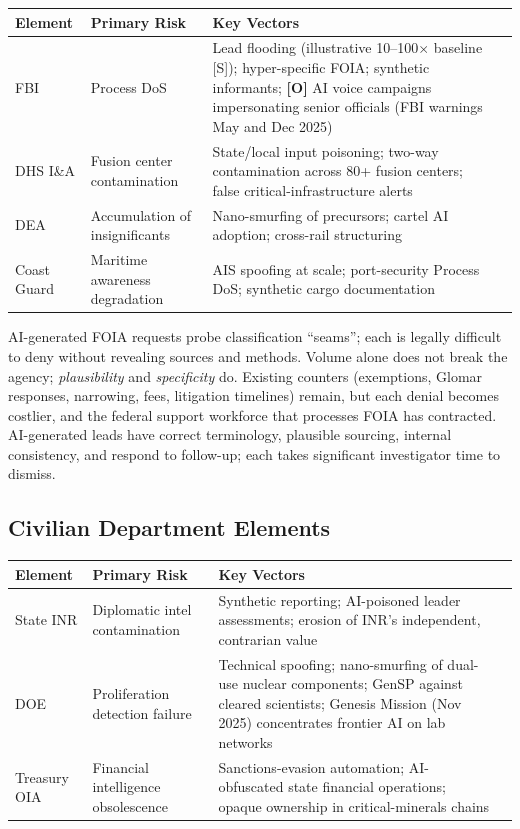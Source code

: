 \documentclass[11pt,letterpaper]{article}
\begin{document}
\begin{center}
\scriptsize
\begin{tabularx}{\linewidth}{ZY{0.42}Y{0.69}Y{1.89}}
\toprule
\textbf{Element} & \textbf{Primary Risk} & \textbf{Key Vectors} \\
\midrule
FBI & Process DoS & Lead flooding (illustrative 10--100$\times$ baseline [S]); hyper-specific FOIA; synthetic informants; \textbf{[O]} AI voice campaigns impersonating senior officials (FBI warnings May and Dec 2025) \\
DHS I\&A & Fusion center contamination & State/local input poisoning; two-way contamination across 80+ fusion centers; false critical-infrastructure alerts \\
DEA & Accumulation of insignificants & Nano-smurfing of precursors; cartel AI adoption; cross-rail structuring \\
Coast Guard & Maritime awareness degradation & AIS spoofing at scale; port-security Process DoS; synthetic cargo documentation \\
\bottomrule
\end{tabularx}
\end{center}

\begin{warnbox}
AI-generated FOIA requests probe classification ``seams''; each is legally difficult to deny without revealing sources and methods. Volume alone does not break the agency; \textit{plausibility} and \textit{specificity} do. Existing counters (exemptions, Glomar responses, narrowing, fees, litigation timelines) remain, but each denial becomes costlier, and the federal support workforce that processes FOIA has contracted. AI-generated leads have correct terminology, plausible sourcing, internal consistency, and respond to follow-up; each takes significant investigator time to dismiss.
\end{warnbox}

\subsection{Civilian Department Elements}

\begin{center}
\scriptsize
\begin{tabularx}{\linewidth}{ZY{0.42}Y{0.69}Y{1.89}}
\toprule
\textbf{Element} & \textbf{Primary Risk} & \textbf{Key Vectors} \\
\midrule
State INR & Diplomatic intel contamination & Synthetic reporting; AI-poisoned leader assessments; erosion of INR's independent, contrarian value \\
DOE & Proliferation detection failure & Technical spoofing; nano-smurfing of dual-use nuclear components; GenSP against cleared scientists; Genesis Mission (Nov 2025) concentrates frontier AI on lab networks \\
Treasury OIA & Financial intelligence obsolescence & Sanctions-evasion automation; AI-obfuscated state financial operations; opaque ownership in critical-minerals chains \\
\bottomrule
\end{tabularx}
\end{center}
\end{document}
